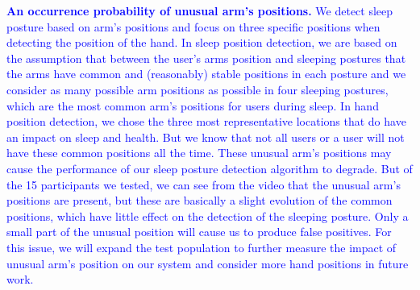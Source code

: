 \begin{itemize}
  \textcolor{blue}{\item \textbf{An occurrence probability of unusual arm's positions.}
  We detect sleep posture based on arm's positions and focus on three specific positions when detecting the position of the hand. In sleep position detection, we are based on the assumption that between the user's arms position and sleeping postures that the arms have common and (reasonably) stable positions in each posture and we consider as many possible arm positions as possible in four sleeping postures, which are the most common arm's positions for users during sleep. In hand position detection, we chose the three most representative locations that do have an impact on sleep and health. But we know that not all users or a user will not have these common positions all the time. These unusual arm's positions may cause the performance of our sleep posture detection algorithm to degrade. But of the 15 participants we tested, we can see from the video that the unusual arm's positions are present, but these are basically a slight evolution of the common positions, which have little effect on the detection of the sleeping posture. Only a small part of the unusual position will cause us to produce false positives. For this issue, we will expand the test population to further measure the impact of unusual arm's position on our system and consider more hand positions in future work.}
\end{itemize}
